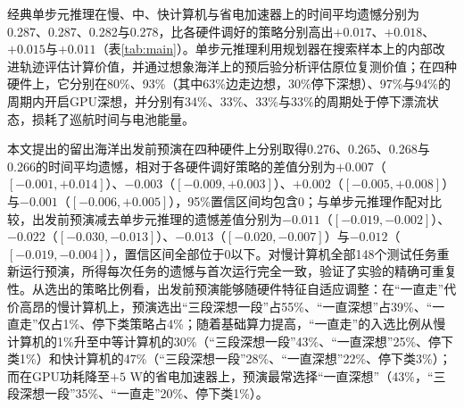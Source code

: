 \begin{table}[htbp]
  \centering
  \caption{2023至2026年148个测试集任务（3天前卫星图，真实海洋偏离0.15，传感器误差0.1）上各控制方式的时间平均遗憾（越低越好）。“调好的”指在该型航行器的120个开发集任务上表现最好的固定策略；括号内为相对于“调好的”策略的差值，方括号内为按赤潮周自助重采样得到的95\%置信区间。}
  \label{tab:main}
  
\end{table}

经典单步元推理在慢、中、快计算机与省电加速器上的时间平均遗憾分别为0.287、0.287、0.282与0.278，比各硬件调好的策略分别高出$+0.017$、$+0.018$、$+0.015$与$+0.011$（表\ref{tab:main}）。单步元推理利用规划器在搜索样本上的内部改进轨迹评估计算价值，并通过想象海洋上的预后验分析评估原位复测价值；在四种硬件上，它分别在80\%、93\%（其中63\%边走边想，30\%停下深想）、97\%与94\%的周期内开启GPU深想，并分别有34\%、33\%、33\%与33\%的周期处于停下漂流状态，损耗了巡航时间与电池能量。

本文提出的留出海洋出发前预演在四种硬件上分别取得0.276、0.265、0.268与0.266的时间平均遗憾，相对于各硬件调好策略的差值分别为$+0.007$（$[-0.001, +0.014]$）、$-0.003$（$[-0.009, +0.003]$）、$+0.002$（$[-0.005, +0.008]$）与$-0.001$（$[-0.006, +0.005]$），95\%置信区间均包含0；与单步元推理作配对比较，出发前预演减去单步元推理的遗憾差值分别为$-0.011$（$[-0.019, -0.002]$）、$-0.022$（$[-0.030, -0.013]$）、$-0.013$（$[-0.020, -0.007]$）与$-0.012$（$[-0.019, -0.004]$），置信区间全部位于0以下。对慢计算机全部148个测试任务重新运行预演，所得每次任务的遗憾与首次运行完全一致，验证了实验的精确可重复性。从选出的策略比例看，出发前预演能够随硬件特征自适应调整：在“一直走”代价高昂的慢计算机上，预演选出“三段深想一段”占55\%、“一直深想”占39\%、“一直走”仅占1\%、停下类策略占4\%；随着基础算力提高，“一直走”的入选比例从慢计算机的1\%升至中等计算机的30\%（“三段深想一段”43\%、“一直深想”25\%、停下类1\%）和快计算机的47\%（“三段深想一段”28\%、“一直深想”22\%、停下类3\%）；而在GPU功耗降至$+5\text{ W}$的省电加速器上，预演最常选择“一直深想”（43\%，“三段深想一段”35\%、“一直走”20\%、停下类1\%）。

